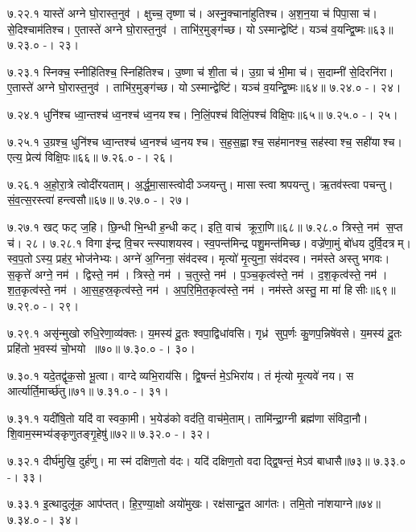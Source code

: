 ७.२२.१
यास्ते॑ अग्ने घो॒रास्त॒नुव॑। क्षुच्च॒ तृष्णा च॑। अस्नु॒क्चाना॑हुतिश्च। अ॒श॒न॒या च॑ पिपा॒सा च॑। से॒दिश्चाम॑तिश्च। ए॒तास्ते॑ अग्ने घो॒रास्त॒नुव॑। ताभि॑र॒मुङ्ग॑च्छ। योऽस्मान्द्वेष्टि॑। यञ्च॑ व॒यन्द्वि॒ष्मः॥६३॥
७.२३.०
-। २३।
\anuvakamend

७.२३.१
स्निक्च॒ स्नीहि॑तिश्च॒ स्निहि॑तिश्च। उ॒ष्णा च॑ शी॒ता च॑। उ॒ग्रा च॑ भी॒मा च॑। स॒दाम्नी॑ से॒दिरनि॑रा। ए॒तास्ते॑ अग्ने घो॒रास्त॒नुव॑। ताभि॑र॒मुङ्ग॑च्छ। योऽस्मान्द्वेष्टि॑। यञ्च॑ व॒यन्द्वि॒ष्मः॥६४॥
७.२४.०
-। २४।
\anuvakamend

७.२४.१
धुनि॑श्च ध्वा॒न्तश्च॑ ध्व॒नश्च॑ ध्व॒नयश्च। नि॒लिं॒पश्च॑ विलिं॒पश्च॑ विक्षि॒पः॥६५॥
७.२५.०
-। २५।
\anuvakamend

७.२५.१
उ॒ग्रश्च॒ धुनि॑श्च ध्वा॒न्तश्च॑ ध्व॒नश्च॑ ध्व॒नयश्च। स॒ह॒स॒ह्वाश्च॒ सह॑मानश्च॒ सह॑स्वाश्च॒ सही॑याश्च। एत्य॒ प्रेत्य॑ विक्षि॒पः॥६६॥
७.२६.०
-। २६।
\anuvakamend

७.२६.१
अ॒हो॒रा॒त्रे त्वोदी॑रयताम्। अ॒र्द्ध॒मा॒सास्त्वोदीञ्जयन्तु। मासास्त्वा श्रपयन्तु। ऋ॒तव॑स्त्वा पचन्तु। सं॒व॒त्स॒रस्त्वा॑ हन्त्वसौ॥६७॥
७.२७.०
-। २७।
\anuvakamend

७.२७.१
खट् फट् ज॒हि। छि॒न्धी भि॒न्धी ह॒न्धी कट्। इति॒ वाच॑ क्रूरा॒णि॥६८॥
७.२८.०
त्रिस्ते॒ नम॑ स॒प्त च॑। २८।
७.२८.१
विगा इ॑न्द्र वि॒चरन्त्स्पाशयस्व। स्व॒पन्त॑मिन्द्र पशु॒मन्त॑मिच्छ। वज्रे॑णा॒मुं बो॑धय दुर्वि॒दत्रम्। स्व॒प॒तोऽस्य॒ प्रह॑र॒ भोज॑नेभ्यः। अग्ने॑ अ॒ग्निना॒ संव॑दस्व। मृत्यो॑ मृ॒त्युना॒ संव॑दस्व। नम॑स्ते अस्तु भगवः। स॒कृत्ते॑ अग्ने॒ नम॑। द्विस्ते॒ नम॑। त्रिस्ते॒ नम॑। च॒तुस्ते॒ नम॑। प॒ञ्च॒कृत्व॑स्ते॒ नम॑। द॒श॒कृत्व॑स्ते॒ नम॑। श॒त॒कृत्व॑स्ते॒ नम॑। आ॒स॒ह॒स्र॒कृत्व॑स्ते॒ नम॑। अ॒प॒रि॒मि॒त॒कृत्व॑स्ते॒ नम॑। नम॑स्ते अस्तु॒ मा मा॑ हिसीः॥६९॥
७.२९.०
-। २९।
\anuvakamend

७.२९.१
असृ॑न्मुखो रुधि॒रेणा॒व्य॑क्तः। य॒मस्य॑ दू॒तः  श्वपा॒द्विधा॑वसि। गृध्र॑ सुप॒र्णः कु॒णप॒न्निषे॑वसे। य॒मस्य॑ दू॒तः प्रहि॑तो भ॒वस्य॑ चो॒भयो॥७०॥
७.३०.०
-। ३०।
\anuvakamend

७.३०.१
यदे॒तद्वृ॑क॒सो भू॒त्वा। वाग्देव्यभि॒राय॑सि। द्वि॒षन्तं॑ मे॒ऽभिरा॑य। तं मृ॑त्यो मृ॒त्यवे॑ नय। स आर्त्यार्ति॒मार्च्छ॑तु॥७१॥
७.३१.०
-। ३१।
\anuvakamend

७.३१.१
यदी॑षि॒तो यदि॑ वा स्वका॒मी। भ॒येड॑को वद॑ति॒ वाच॑मे॒ताम्। तामि॑न्द्रा॒ग्नी ब्रह्म॑णा संविदा॒नौ। शि॒वाम॒स्मभ्य॑ङ्कृणुतङ्गृ॒हेषु॑॥७२॥
७.३२.०
-। ३२।
\anuvakamend

७.३२.१
दीर्घ॑मुखि॒ दुर्\mbox{}ह॑णु। मा स्म॑ दक्षिण॒तो व॑दः। यदि॑ दक्षिण॒तो वदाद्द्वि॒षन्तं॒ मेऽव॑ बाधासै॥७३॥
७.३३.०
-। ३३।
\anuvakamend

७.३३.१
इ॒त्थादुलू॑क॒ आप॑प्तत्। हि॒र॒ण्या॒क्षो अयो॑मुखः। रक्ष॑सान्दू॒त आग॑तः। तमि॒तो ना॑शयाग्ने॥७४॥
७.३४.०
-। ३४।
\anuvakamend

